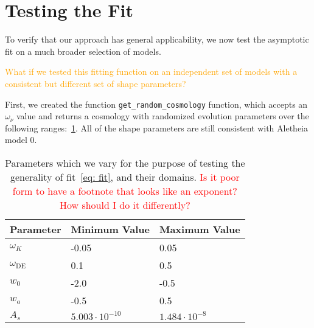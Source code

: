 \section{Testing the Fit}
\label{sec: fit_testing}

To verify that our approach has general applicability, we now test the
asymptotic fit on a much broader selection of models.

\textcolor{orange}{What if we tested this fitting function on an independent
set of models with a consistent but different set of shape parameters?}

First, we created the function \verb|get_random_cosmology| function, which
accepts an $\omega_\nu$ value and returns a cosmology with randomized
evolution parameters over the following ranges:~\ref{tab: fit_test_params}.
All of the shape parameters are still consistent with Aletheia model 0.

\begin{table}[ht!]
\centering
\begin{tabular}{l|l|l}
\hline
Parameter & Minimum Value & Maximum Value \\ \hline
$\omega_K$ & -0.05 & 0.05 \\
$\omega_\text{DE}$\footnotemark & 0.1 & 0.5 \\
$w_0$ & -2.0 & -0.5 \\
$w_a$ & -0.5 & 0.5 \\
$A_s$\footnotemark & $5.003 \cdot 10^{-10}$ & $1.484 \cdot 10^{-8}$  \\
\end{tabular}
 \cprotect\caption[Parameter Ranges for Random Test
 	Cosmologies]{Parameters which we vary for the purpose of testing the
 	generality of fit~\ref{eq: fit}, and their domains.
 	\textcolor{red}{Is it poor form to have a footnote that looks like an
 	exponent? How should I do it differently?}}
 \label{tab: fit_test_params}
\end{table}

\addtocounter{footnote}{-1}


